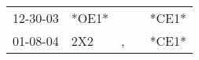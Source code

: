 \begin{supertabular}{lllll}
 12-30-03 &  *OE1* &    &   &  *CE1* \\
 01-08-04 &    2X2 &  , &   &  *CE1* \\
\end{supertabular}
